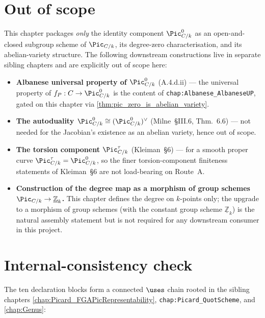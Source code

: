 \section{Out of scope}
\label{sec:pic0_out_of_scope}

This chapter packages \emph{only} the identity component
\(\Pic^0_{C/k}\) as an open-and-closed subgroup scheme of \(\Pic_{C/k}\),
its degree-zero characterisation, and its abelian-variety structure.
The following downstream constructions live in separate sibling
chapters and are explicitly out of scope here:

\begin{itemize}
  \item \textbf{Albanese universal property of \(\Pic^0_{C/k}\)}
    (A.4.d.ii) --- the universal property of \(f_P : C \to \Pic^0_{C/k}\)
    is the content of \texttt{chap:Albanese\_AlbaneseUP}, gated on this
    chapter via \cref{thm:pic_zero_is_abelian_variety}.
  \item \textbf{The autoduality \(\Pic^0_{C/k} \cong (\Pic^0_{C/k})^\vee\)}
    (Milne~\S III.6, Thm.~6.6) --- not needed for the Jacobian's
    existence as an abelian variety, hence out of scope.
  \item \textbf{The torsion component \(\Pic^\tau_{C/k}\)}
    (Kleiman~\S 6) --- for a smooth proper curve
    \(\Pic^\tau_{C/k} = \Pic^0_{C/k}\), so the finer torsion-component
    finiteness statements of Kleiman~\S 6 are not load-bearing on
    Route~A.
  \item \textbf{Construction of the degree map as a morphism of group
    schemes \(\Pic_{C/k} \to \underline{\mathbb{Z}}_k\).} This chapter
    defines the degree on \(k\)-points only; the upgrade to a
    morphism of group schemes (with the constant group scheme
    \(\underline{\mathbb{Z}}_k\)) is the natural assembly statement but
    is not required for any downstream consumer in this project.
\end{itemize}

\section{Internal-consistency check}
\label{sec:pic0_consistency_check}

The ten declaration blocks form a connected \(\uses\) chain rooted in
the sibling chapters \cref{chap:Picard_FGAPicRepresentability},
\texttt{chap:Picard\_QuotScheme}, and \cref{chap:Genus}:

